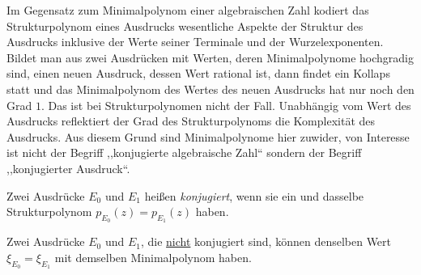 \begin{remark}
Im Gegensatz zum Minimalpolynom einer algebraischen Zahl
kodiert das Strukturpolynom eines Ausdrucks
wesentliche Aspekte der Struktur des Ausdrucks
inklusive der Werte seiner Terminale
und der Wurzelexponenten.
Bildet man aus zwei Ausdrücken mit Werten,
deren Minimalpolynome hochgradig sind,
einen neuen Ausdruck, 
dessen Wert rational ist,
dann findet ein Kollaps statt und
das Minimalpolynom des Wertes des neuen Ausdrucks
hat nur noch den Grad $1$.
Das ist bei Strukturpolynomen nicht der Fall.
Unabhängig vom Wert des Ausdrucks reflektiert
der Grad des Strukturpolynoms 
die Komplexität des Ausdrucks.
Aus diesem Grund sind Minimalpolynome hier zuwider,
von Interesse ist nicht der Begriff
,,konjugierte algebraische Zahl``
sondern der Begriff ,,konjugierter Ausdruck``.
\end{remark}


\begin{definition}\label{de:Konjugierter Ausdruck}
Zwei Ausdrücke $E_0$ und $E_1$ heißen {\em konjugiert},
wenn sie ein und dasselbe Strukturpolynom 
$p_{E_0}(z)=p_{E_1}(z)$ haben.
\begin{note}
Zwei Ausdrücke $E_0$ und $E_1$,
die \underline{nicht} konjugiert sind, 
können denselben Wert $\xi_{E_0}=\xi_{E_1}$
mit demselben Minimalpolynom haben.
\end{note}
\end{definition}
